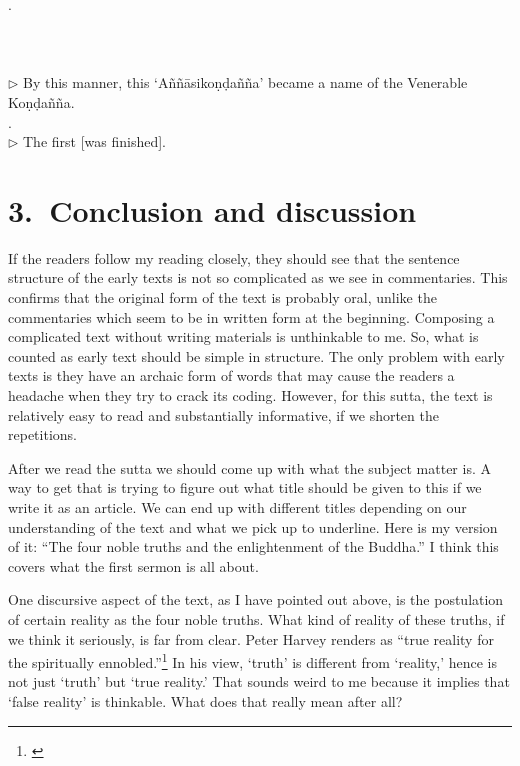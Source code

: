 . \\
\small
{}  \\   \\\\
\normalsize
$\triangleright$ By this manner, this `A\~n\~n\=asiko\d n\d da\~n\~na' became a name of the Venerable Ko\d n\d da\~n\~na.\\

. \\
$\triangleright$ The first [was finished].\\

{}
\section*{3.\ Conclusion and discussion}

If the readers follow my reading closely, they should see that the sentence structure of the early texts is not so complicated as we see in commentaries. This confirms that the original form of the text is probably oral, unlike the commentaries which seem to be in written form at the beginning. Composing a complicated text without writing materials is unthinkable to me. So, what is counted as early text should be simple in structure. The only problem with early texts is they have an archaic form of words that may cause the readers a headache when they try to crack its coding. However, for this sutta, the text is relatively easy to read and substantially informative, if we shorten the repetitions.

After we read the sutta we should come up with what the subject matter is. A way to get that is trying to figure out what title should be given to this if we write it as an article. We can end up with different titles depending on our understanding of the text and what we pick up to underline. Here is my version of it: ``The four noble truths and the enlightenment of the Buddha.'' I think this covers what the first sermon is all about.

One discursive aspect of the text, as I have pointed out above, is the postulation of certain reality as the four noble truths. What kind of reality of these truths, if we think it seriously, is far from clear. Peter Harvey renders  as ``true reality for the spiritually ennobled.''\footnote{\citealp[p.~51]{harvey:buddhism}} In his view, `truth' is different from `reality,' hence  is not just `truth' but `true reality.' That sounds weird to me because it implies that `false reality' is thinkable. What does that really mean after all?

